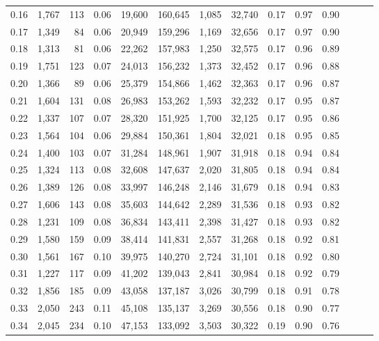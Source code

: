 \begin{tabular}{rrrrrrrrrrrrrr}
0.16 &  1,767 &  113 &  0.06 &   19,600 &  160,645 &   1,085 &  32,740 &  0.17 &  0.97 &      0.90 \\
0.17 &  1,349 &   84 &  0.06 &   20,949 &  159,296 &   1,169 &  32,656 &  0.17 &  0.97 &      0.90 \\
0.18 &  1,313 &   81 &  0.06 &   22,262 &  157,983 &   1,250 &  32,575 &  0.17 &  0.96 &      0.89 \\
0.19 &  1,751 &  123 &  0.07 &   24,013 &  156,232 &   1,373 &  32,452 &  0.17 &  0.96 &      0.88 \\
0.20 &  1,366 &   89 &  0.06 &   25,379 &  154,866 &   1,462 &  32,363 &  0.17 &  0.96 &      0.87 \\
0.21 &  1,604 &  131 &  0.08 &   26,983 &  153,262 &   1,593 &  32,232 &  0.17 &  0.95 &      0.87 \\
0.22 &  1,337 &  107 &  0.07 &   28,320 &  151,925 &   1,700 &  32,125 &  0.17 &  0.95 &      0.86 \\
0.23 &  1,564 &  104 &  0.06 &   29,884 &  150,361 &   1,804 &  32,021 &  0.18 &  0.95 &      0.85 \\
0.24 &  1,400 &  103 &  0.07 &   31,284 &  148,961 &   1,907 &  31,918 &  0.18 &  0.94 &      0.84 \\
0.25 &  1,324 &  113 &  0.08 &   32,608 &  147,637 &   2,020 &  31,805 &  0.18 &  0.94 &      0.84 \\
0.26 &  1,389 &  126 &  0.08 &   33,997 &  146,248 &   2,146 &  31,679 &  0.18 &  0.94 &      0.83 \\
0.27 &  1,606 &  143 &  0.08 &   35,603 &  144,642 &   2,289 &  31,536 &  0.18 &  0.93 &      0.82 \\
0.28 &  1,231 &  109 &  0.08 &   36,834 &  143,411 &   2,398 &  31,427 &  0.18 &  0.93 &      0.82 \\
0.29 &  1,580 &  159 &  0.09 &   38,414 &  141,831 &   2,557 &  31,268 &  0.18 &  0.92 &      0.81 \\
0.30 &  1,561 &  167 &  0.10 &   39,975 &  140,270 &   2,724 &  31,101 &  0.18 &  0.92 &      0.80 \\
0.31 &  1,227 &  117 &  0.09 &   41,202 &  139,043 &   2,841 &  30,984 &  0.18 &  0.92 &      0.79 \\
0.32 &  1,856 &  185 &  0.09 &   43,058 &  137,187 &   3,026 &  30,799 &  0.18 &  0.91 &      0.78 \\
0.33 &  2,050 &  243 &  0.11 &   45,108 &  135,137 &   3,269 &  30,556 &  0.18 &  0.90 &      0.77 \\
0.34 &  2,045 &  234 &  0.10 &   47,153 &  133,092 &   3,503 &  30,322 &  0.19 &  0.90 &      0.76 \\

\end{tabular}
